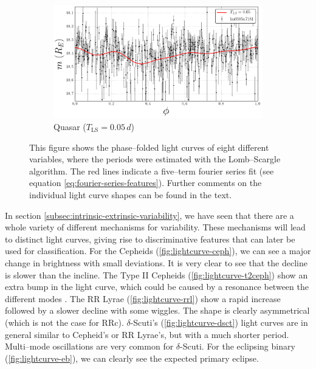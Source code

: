 \begin{figure}[h]
\begin{subfigure}[t]{0.49\textwidth}
	\end{subfigure}
	\begin{subfigure}[t]{0.49\textwidth}
		\centering
		\caption{Quasar ($T_{\text{LS}} = 0.05 \, \unit{d}$)}
		\label{fig:lightcurve-qso}
		\includegraphics[width=\textwidth]{figures/lightcurves/qso.png}
	\end{subfigure}
	\caption[Light curves for different variable sources]{This figure shows the phase--folded light curves of eight different variables, where the periods were estimated with the Lomb--Scargle algorithm. The red lines indicate a five--term fourier series fit (see equation \eqref{eq:fourier-series-features}). Further comments on the individual light curve shapes can be found in the text.}
	\label{fig:various-light-curves}
\end{figure}

In section \ref{subsec:intrinsic-extrinsic-variability}, we have seen that there are a whole variety of different mechanisms for variability. These mechanisms will lead to distinct light curves, giving rise to discriminative features that can later be used for classification. For the Cepheids (\ref{fig:lightcurve-ceph}), we can see a major change in brightness with small deviations. It is very clear to see that the decline is slower than the incline. The Type II Cepheids (\ref{fig:lightcurve-t2ceph}) show an extra bump in the light curve, which could be caused by a resonance between the different modes \citep{caputo1999}. The RR Lyrae (\ref{fig:lightcurve-rrl}) show a rapid increase followed by a slower decline with some wiggles. The shape is clearly asymmetrical (which is not the case for RRc). $\delta$-Scuti's (\ref{fig:lightcurve-dsct}) light curves are in general similar to Cepheid's or RR Lyrae's, but with a much shorter period. Multi--mode oscillations are very common for $\delta$-Scuti. For the eclipsing binary (\ref{fig:lightcurve-eb}), we can clearly see the expected primary eclipse.

